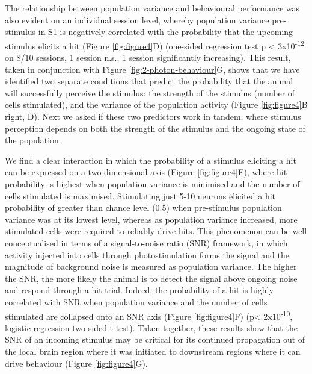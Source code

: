 The relationship between population variance and behavioural performance was also evident on an individual session level, whereby population variance pre-stimulus in S1 is negatively correlated with the probability that the upcoming stimulus elicits a hit (Figure \ref{fig:figure4}D) (one-sided regression test p < 3x10\textsuperscript{-12} on 8/10 sessions, 1 session n.s., 1 session significantly increasing). This result, taken in conjunction with Figure \ref{fig:2-photon-behaviour}G, shows that we have identified two separate conditions that predict the probability that the animal will successfully perceive the stimulus: the strength of the stimulus (number of cells stimulated), and the variance of the population activity (Figure \ref{fig:figure4}B right, D). Next we asked if these two predictors work in tandem, where stimulus perception depends on both the strength of the stimulus and the ongoing state of the population.

We find a clear interaction in which the probability of a stimulus eliciting a hit can be expressed on a two-dimensional axis (Figure \ref{fig:figure4}E), where hit probability is highest when population variance is minimised and the number of cells stimulated is maximised. Stimulating just 5-10 neurons elicited a hit probability of greater than chance level (0.5) when pre-stimulus population variance was at its lowest level, whereas as population variance increased, more stimulated cells were required to reliably drive hits. This phenomenon can be well conceptualised in terms of a signal-to-noise ratio (SNR) framework, in which activity injected into cells through photostimulation forms the signal and the magnitude of background noise is measured as population variance. The higher the SNR, the more likely the animal is to detect the signal above ongoing noise and respond through a hit trial. Indeed, the probability of a hit is highly correlated with SNR when population variance and the number of cells stimulated are collapsed onto an SNR axis (Figure \ref{fig:figure4}F) (p< 2x10\textsuperscript{-10}, logistic regression two-sided t test). Taken together, these results show that the SNR of an incoming stimulus may be critical for its continued propagation out of the local brain region where it was initiated to downstream regions where it can drive behaviour (Figure \ref{fig:figure4}G).
